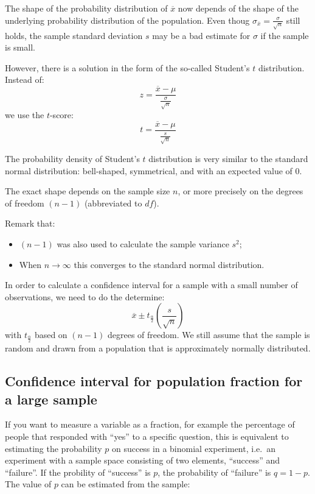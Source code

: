 The shape of the probability distribution of $\overline{x}$ now depends of the shape of the underlying probability distribution of the population. Even thoug $\sigma_{\overline{x}} = \frac{\sigma}{\sqrt{n}}$ still holds, the sample standard deviation $s$ may be a bad estimate for $\sigma$ if the sample is small.

However, there is a solution in the form of the so-called Student's $t$ distribution. Instead of:
\[ z = \frac{\overline{x} - \mu}{\frac{\sigma}{\sqrt{n}}} \]
we use the $t$-score:
\[ t = \frac{\overline{x} - \mu}{\frac{s}{\sqrt{n}}} \]

The probability density of Student's $t$ distribution is very similar to the standard normal distribution: bell-shaped, symmetrical, and with an expected value of 0.

The exact shape depends on the sample size $n$, or more precisely on the degrees of freedom $(n-1)$ (abbreviated to $df$).

Remark that:
\begin{itemize}
  \item $(n-1)$ was also used to calculate the sample variance $s^{2}$;
  \item When $n \rightarrow \infty$ this converges to the standard normal distribution.
\end{itemize}

In order to calculate a confidence interval for a sample with a small number of observations, we need to do the determine:
\[ \overline{x} \pm t_{\frac{\alpha}{2}}\left(\frac{s}{\sqrt{n}}\right) \]
with $t_{\frac{\alpha}{2}}$ based on $(n-1)$ degrees of freedom. We still assume that the sample is random and drawn from a population that is approximately normally distributed.

\subsection{Confidence interval for population fraction for a large sample}
\label{ssec:confidence-interval-pop-fraction-large-sample}

If you want to measure a variable as a fraction, for example the percentage of people that responded with ``yes'' to a specific question, this is equivalent to estimating the probability $p$ on success in a binomial experiment, i.e.~an experiment with a sample space consisting of two elements, ``success'' and ``failure''. If the probility of ``success'' is $p$, the probability of ``failure'' is $q = 1 - p$. The value of $p$ can be estimated from the sample:

